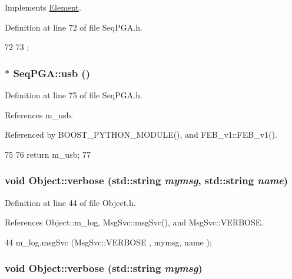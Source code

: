 Implements \hyperlink{classElement_a4e6c83efae95616ebddd03c793a26661}{Element}.

Definition at line 72 of file SeqPGA.h.


\begin{DoxyCode}
72                  {
73   };
\end{DoxyCode}
\hypertarget{classSeqPGA_a10c68ea9de38eb0445d47e4b21b580a1}{
\subsubsection[{usb}]{$\ast$ SeqPGA::usb ()}}
\label{classSeqPGA_a10c68ea9de38eb0445d47e4b21b580a1}


Definition at line 75 of file SeqPGA.h.

References m\_\-usb.

Referenced by BOOST\_\-PYTHON\_\-MODULE(), and FEB\_\-v1::FEB\_\-v1().


\begin{DoxyCode}
75                          {
76     return m_usb;
77   }
\end{DoxyCode}
\hypertarget{classObject_a2d4120195317e2a3c6532e8bb9f3da68}{
\subsubsection[{verbose}]{\setlength{\rightskip}{0pt plus 5cm}void Object::verbose (std::string {\em mymsg}, \/  std::string {\em name})}}
\label{classObject_a2d4120195317e2a3c6532e8bb9f3da68}


Definition at line 44 of file Object.h.

References Object::m\_\-log, MsgSvc::msgSvc(), and MsgSvc::VERBOSE.


\begin{DoxyCode}
44 { m_log.msgSvc (MsgSvc::VERBOSE , mymsg, name ); }
\end{DoxyCode}
\hypertarget{classObject_a83d2db2df682907ea1115ad721c1c4a1}{
\subsubsection[{verbose}]{\setlength{\rightskip}{0pt plus 5cm}void Object::verbose (std::string {\em mymsg})}}
\label{classObject_a83d2db2df682907ea1115ad721c1c4a1}


